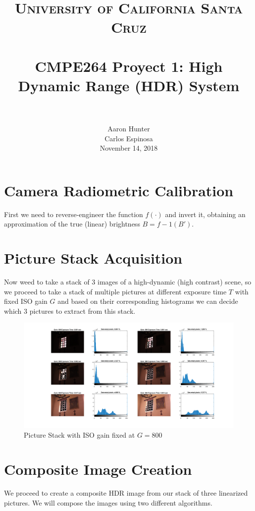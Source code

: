 \documentclass[a4paper]{article}
\title{
		\vspace{-0.6in} 	
		\usefont{OT1}{bch}{b}{n}
		\normalfont \normalsize \textsc{University of California Santa Cruz} \\ [10pt]
		\horrule{0.5pt} \\[0.4cm]
		\huge CMPE264 Proyect 1: High Dynamic Range (HDR) System \\
		\horrule{2pt} \\[0.5cm]
}
\author{
		\normalfont 								
        Aaron Hunter\\  Carlos Espinosa\\[-3pt]		\normalsize
        November 14, 2018
}
\date{}
\begin{document}
\maketitle
\section{Camera Radiometric Calibration}
First we need to reverse-engineer the function $f(\cdot)$ and invert it, obtaining an approximation of the true (linear) brightness $B=f-1(B')$.
\section{Picture Stack Acquisition}
Now weed to take a stack of 3 images of a high-dynamic (high contrast) scene, so we proceed to take a stack of multiple pictures at different exposure time $T$ with fixed ISO gain $G$ and based on their corresponding histograms we can decide which 3 pictures to extract from this stack.

\begin{figure}[H]
\centering
\includegraphics[trim=7cm 1cm 1cm 0cm clip, scale=.4]{Chapel_Histogram_set.png}
\caption{Picture Stack with ISO gain fixed at $G = 800$}
\label{fig:PicStack}
\end{figure}
\FloatBarrier
\section{Composite Image Creation}
We proceed to create a composite HDR image from our stack of three linearized pictures. We will compose the images using two different algorithms.
\end{document}
